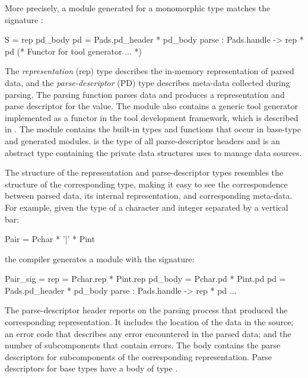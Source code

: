 More precisely, a module generated for a monomorphic \padsml{} type 
matches the signature :
\begin{code}\scriptsize
{}  S = 
   rep
   pd\_body
   pd = Pads.pd_header * pd_body
   parse : Pads.handle -> rep * pd
  (* Functor for tool generator ... *)
\end{code}%
\noindent 
The \emph{representation} (rep) type describes the
in-memory representation of parsed data, and the
\emph{parse-descriptor} (PD) type describes meta-data collected
during parsing.
The parsing function parses data and produces a
representation and parse descriptor for the value.
The module also contains 
a generic tool generator implemented as a functor
in the tool development framework, which is described in .
The module  contains the
built-in types and functions that occur in base-type and generated
modules.   is the type of all parse-descriptor
headers and  is an abstract type containing the
private data structures \padsml{} uses to manage data sources.

The structure of the representation and parse-descriptor types
resembles the structure of the corresponding \padsml{} type, making it
easy to see the correspondence between parsed data, its internal
representation, and corresponding meta-data.  
For example, given the \padsml{} type of a character
and integer separated by a vertical bar:
\begin{code}\scriptsize
   Pair = Pchar * '|' * Pint\end{code}%
the compiler generates a module with the signature:
\begin{code}\scriptsize
{}  Pair_sig = 
   rep     = Pchar.rep * Pint.rep
   pd_body = Pchar.pd  * Pint.pd
   pd      = Pads.pd_header * pd_body
    parse   : Pads.handle -> rep * pd
  ...
\end{code}%
\noindent 
The parse-descriptor header reports on the parsing
process that produced the corresponding representation.  It includes
the location of the data in the source; an error code that
describes any error encountered in the parsed data; and the number of
subcomponents that contain errors.  The body contains the parse
descriptors for subcomponents of the corresponding representation.
Parse descriptors for base types have a body of type .

